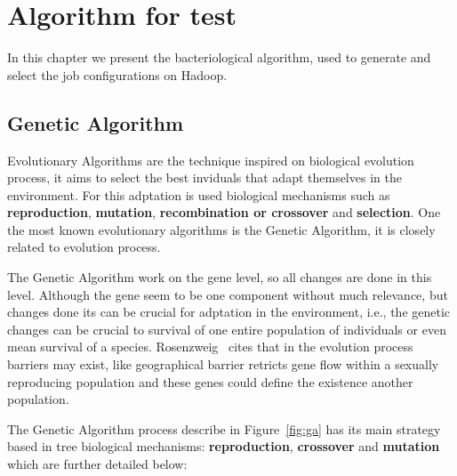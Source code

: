 \chapter{Algorithm for test}
\label{cha:bacAlg}

In this chapter we present the bacteriological algorithm, used to generate and
select the job configurations on Hadoop. 

\section{Genetic Algorithm}
\label{subsec:evolutionay_algorithms}
Evolutionary Algorithms are the technique inspired on biological evolution process,
it aims to select the best inviduals that adapt themselves in the environment. For
this adptation is used biological mechanisms such as \textbf{reproduction}, \textbf{mutation},
\textbf{recombination or crossover} and \textbf{selection}. One the most known
evolutionary algorithms is the Genetic Algorithm, it is closely related to evolution
process.

The Genetic Algorithm work on the gene level, so all changes are done in this level.
Although the gene seem to be one component without much relevance, but changes done
its can be crucial for adptation in the environment, i.e., the genetic changes
can be crucial to survival of one entire population of individuals or even mean
survival of a species. Rosenzweig~\cite{rosenzweig:1995} cites that in the evolution
process barriers may exist, like geographical barrier retricts gene flow within
a sexually reproducing population and these genes could define the existence another
population.

The Genetic Algorithm process describe in Figure~\ref{fig:ga} has its main strategy
based in tree biological mechanisms: \textbf{reproduction}, \textbf{crossover}
and \textbf{mutation} which are further detailed below:

